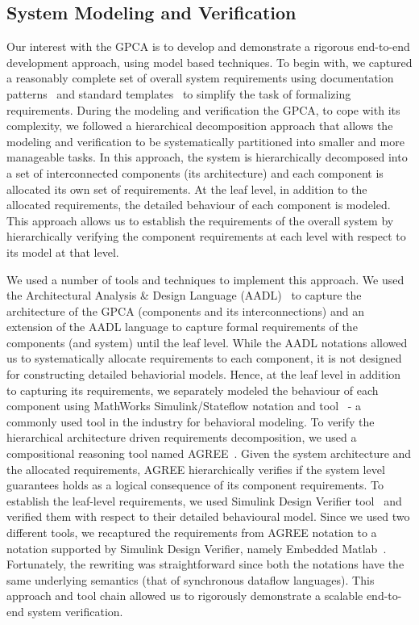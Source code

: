 \subsection {System Modeling and Verification}
\vspace{-0.07in}
Our interest with the GPCA is to develop and demonstrate a rigorous end-to-end development approach, using model based techniques. To begin with, we captured a reasonably complete set of overall system requirements using documentation patterns~\cite{mavin2009easy} and standard templates~\cite{IEEESRS} to simplify the task of formalizing requirements. During the modeling and verification the GPCA, to cope with its complexity, we followed a hierarchical decomposition approach that allows the modeling and verification to be systematically partitioned into smaller and more manageable tasks. In this approach, the system is hierarchically decomposed into a set of interconnected components (its architecture) and each component is allocated its own set of requirements. At the leaf level, in addition to the allocated requirements, the detailed behaviour of each component is modeled. This approach allows us to establish the requirements of the overall system by hierarchically verifying the component requirements at each level with respect to its model at that level.

We used a number of tools and techniques to implement this approach. We used the Architectural Analysis \& Design Language (AADL)~\cite{AADL:Overview} to capture the architecture of the GPCA (components and its interconnections) and an extension of the AADL language to capture formal requirements of the components (and system) until the leaf level. While the AADL notations allowed us to systematically allocate requirements to each component, it is not designed for constructing detailed behaviorial models. Hence, at the leaf level in addition to capturing its requirements, we separately modeled the behaviour of each component using MathWorks Simulink/Stateflow notation and tool~\cite{MathWorks} - a commonly used tool in the industry for behavioral modeling. To verify the hierarchical architecture driven requirements decomposition, we used a compositional reasoning tool named AGREE~\cite{NFM2012:CoGaMiWhLaLu}. Given the system architecture and the allocated requirements, AGREE hierarchically verifies if the system level guarantees holds as a logical consequence of its component requirements. To establish the leaf-level requirements, we used Simulink Design Verifier tool~\cite{MathWorks} and verified them with respect to their detailed behavioural model. Since we used two different tools, we recaptured the requirements from AGREE notation to a notation supported by Simulink Design Verifier, namely Embedded Matlab~\cite{MathWorks}. Fortunately, the rewriting was straightforward since both the notations have the same underlying semantics (that of synchronous dataflow languages). This approach and tool chain allowed us to rigorously demonstrate a scalable end-to-end system verification.

